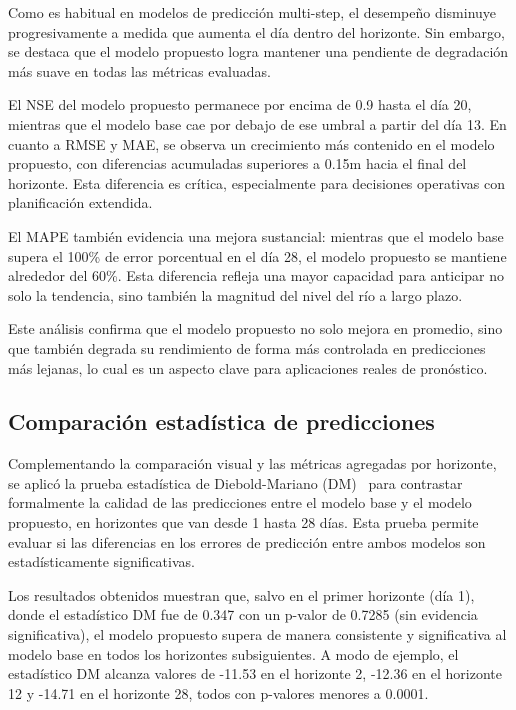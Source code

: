 Como es habitual en modelos de predicción multi-step, el desempeño disminuye progresivamente a medida que aumenta el día dentro del horizonte. Sin embargo, se destaca que el modelo propuesto logra mantener una pendiente de degradación más suave en todas las métricas evaluadas.

El NSE del modelo propuesto permanece por encima de 0.9 hasta el día 20, mientras que el modelo base cae por debajo de ese umbral a partir del día 13. En cuanto a RMSE y MAE, se observa un crecimiento más contenido en el modelo propuesto, con diferencias acumuladas superiores a 0.15m hacia el final del horizonte. Esta diferencia es crítica, especialmente para decisiones operativas con planificación extendida.

El MAPE también evidencia una mejora sustancial: mientras que el modelo base supera el 100\% de error porcentual en el día 28, el modelo propuesto se mantiene alrededor del 60\%. Esta diferencia refleja una mayor capacidad para anticipar no solo la tendencia, sino también la magnitud del nivel del río a largo plazo.

Este análisis confirma que el modelo propuesto no solo mejora en promedio, sino que también degrada su rendimiento de forma más controlada en predicciones más lejanas, lo cual es un aspecto clave para aplicaciones reales de pronóstico.

\subsection{Comparación estadística de predicciones}
\label{ssec:prueba_dm}

Complementando la comparación visual y las métricas agregadas por horizonte, se aplicó la prueba estadística de Diebold-Mariano (DM)~\cite{diebold1995comparing} para contrastar formalmente la calidad de las predicciones entre el modelo base y el modelo propuesto, en horizontes que van desde 1 hasta 28 días. Esta prueba permite evaluar si las diferencias en los errores de predicción entre ambos modelos son estadísticamente significativas.

Los resultados obtenidos muestran que, salvo en el primer horizonte (día 1), donde el estadístico DM fue de 0.347 con un p-valor de 0.7285 (sin evidencia significativa), el modelo propuesto supera de manera consistente y significativa al modelo base en todos los horizontes subsiguientes. A modo de ejemplo, el estadístico DM alcanza valores de -11.53 en el horizonte 2, -12.36 en el horizonte 12 y -14.71 en el horizonte 28, todos con p-valores menores a 0.0001.


